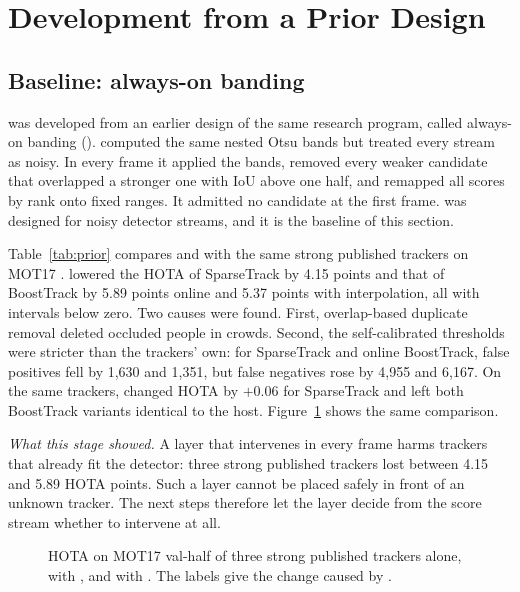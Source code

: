 \section{Development from a Prior Design}\label{sec:development}

\subsection{Baseline: always-on banding}\label{sec:prior}
\scl{} was developed from an earlier design of the same research program,
called always-on banding (\aob{}). \aob{} computed the same nested Otsu bands
but treated every stream as noisy. In every frame it applied the bands,
removed every weaker candidate that overlapped a stronger one with IoU above
one half, and remapped all scores by rank onto fixed ranges. It admitted no
candidate at the first frame. \aob{} was designed for noisy detector streams,
and it is the baseline of this section.

Table~\ref{tab:prior} compares \aob{} and \scl{} with the same strong published
trackers on MOT17 \cite{milan2016mot16}. \aob{} lowered the HOTA of
SparseTrack by 4.15 points and that of BoostTrack by 5.89 points online and
5.37 points with interpolation, all with intervals below zero. Two causes were
found. First, overlap-based duplicate removal deleted occluded people in
crowds. Second, the self-calibrated thresholds were stricter than the
trackers' own: for SparseTrack and online BoostTrack, false positives fell by
1,630 and 1,351, but false negatives rose by 4,955 and 6,167. On the same
trackers, \scl{} changed HOTA by $+0.06$ for SparseTrack and left both
BoostTrack variants identical to the host. Figure~\ref{fig:prior} shows the
same comparison.

\emph{What this stage showed.} A layer that intervenes in every frame harms
trackers that already fit the detector: three strong published trackers lost
between 4.15 and 5.89 HOTA points. Such a layer cannot be placed safely in
front of an unknown tracker. The next steps therefore let the layer decide
from the score stream whether to intervene at all.



\begin{figure}[t]
\centering

\caption{HOTA on MOT17 val-half of three strong published trackers alone, with
\aob{}, and with \scl{}. The labels give the change caused by \aob{}.}
\label{fig:prior}
\end{figure}

